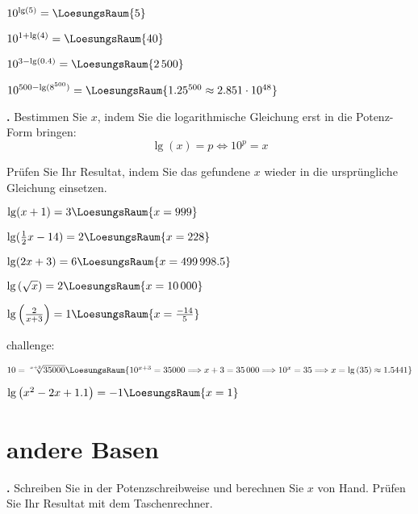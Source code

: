 \begin{bbwAufgabenBlock}
\item $10^{\lg(5)} =  \LoesungsRaum{5}$
\item $10^{1+\lg(4)} =  \LoesungsRaum{40}$
\item $10^{3-\lg(0.4)} =  \LoesungsRaum{2\,500}$
\item $10^{500-\lg(8^{500})} = \LoesungsRaum{1.25^{500} \approx 2.851\cdot{}10^{48}}$
\end{bbwAufgabenBlock}


\newpage

\textbf{\bbwAufgabenNummer{}.}
Bestimmen Sie $x$, indem Sie die logarithmische Gleichung erst in die
Potenz-Form bringen:
$$\lg(x) = p \Longleftrightarrow 10^p = x$$

Prüfen Sie Ihr Resultat, indem Sie das gefundene $x$ wieder in die
ursprüngliche Gleichung einsetzen.

\begin{bbwAufgabenBlock}
\item $\lg(x+1)= 3  \LoesungsRaum{x=999}$
\item $\lg(\frac12 x - 14)= 2  \LoesungsRaum{x=228}$
\item $\lg(2x+3)= 6  \LoesungsRaum{x=499\,998.5}$
\item $\lg\left(\sqrt{x}\right)= 2  \LoesungsRaum{x=10\,000}$
\item $\lg\left(\frac2{x+3}\right)=
1  \LoesungsRaum{x=\frac{-14}5}$

challenge:

\item $10 = \sqrt[x+3]{35000}   \LoesungsRaum{10^{x+3} = 35000 \Longrightarrow x+3 = 35\,000 \Longrightarrow 10^x = 35 \Longrightarrow x=\lg{}(35) \approx 1.5441}$


\item $\lg\left( x^2-2x+1.1 \right)= -1  \LoesungsRaum{x=1}$

\end{bbwAufgabenBlock}

\newpage
\section{andere Basen}

\textbf{\bbwAufgabenNummer{}.}
Schreiben Sie in der Potenzschreibweise und berechnen Sie $x$ von
Hand.
Prüfen Sie Ihr Resultat mit dem Taschenrechner.


